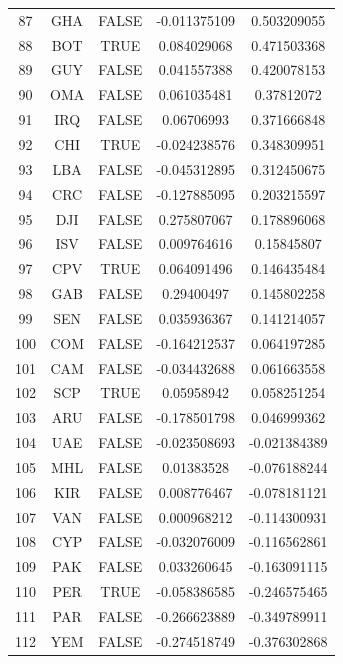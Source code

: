 \documentclass[12pt]{article}
\begin{document}
\begin{longtable}{|c|c|c|c|c|}
87 & GHA & FALSE & -0.011375109 & 0.503209055 \\
88 & BOT & TRUE & 0.084029068 & 0.471503368 \\
89 & GUY & FALSE & 0.041557388 & 0.420078153 \\
90 & OMA & FALSE & 0.061035481 & 0.37812072 \\
91 & IRQ & FALSE & 0.06706993 & 0.371666848 \\
92 & CHI & TRUE & -0.024238576 & 0.348309951 \\
93 & LBA & FALSE & -0.045312895 & 0.312450675 \\
94 & CRC & FALSE & -0.127885095 & 0.203215597 \\
95 & DJI & FALSE & 0.275807067 & 0.178896068 \\
96 & ISV & FALSE & 0.009764616 & 0.15845807 \\
97 & CPV & TRUE & 0.064091496 & 0.146435484 \\
98 & GAB & FALSE & 0.29400497 & 0.145802258 \\
99 & SEN & FALSE & 0.035936367 & 0.141214057 \\
100 & COM & FALSE & -0.164212537 & 0.064197285 \\
101 & CAM & FALSE & -0.034432688 & 0.061663558 \\
102 & SCP & TRUE & 0.05958942 & 0.058251254 \\
103 & ARU & FALSE & -0.178501798 & 0.046999362 \\
104 & UAE & FALSE & -0.023508693 & -0.021384389 \\
105 & MHL & FALSE & 0.01383528 & -0.076188244 \\
106 & KIR & FALSE & 0.008776467 & -0.078181121 \\
107 & VAN & FALSE & 0.000968212 & -0.114300931 \\
108 & CYP & FALSE & -0.032076009 & -0.116562861 \\
109 & PAK & FALSE & 0.033260645 & -0.163091115 \\
110 & PER & TRUE & -0.058386585 & -0.246575465 \\
111 & PAR & FALSE & -0.266623889 & -0.349789911 \\
112 & YEM & FALSE & -0.274518749 & -0.376302868 \\
\hline
\end{longtable}
\end{document}
